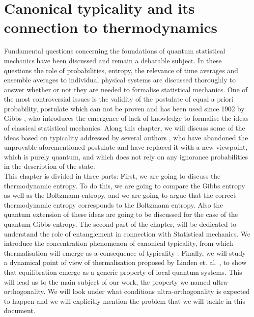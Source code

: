\chapter{Canonical typicality and its connection to thermodynamics}
Fundamental questions concerning the foundations of quantum statistical mechanics have been discussed and remain a debatable subject\cite{singh_foundations_2013}. In these questions the role of probabilities, entropy, the relevance of time averages and ensemble averages to individual physical systems are discussed thoroughly \cite{gemmer_quantum_2004} to answer whether or not they are needed to formalise statistical mechanics. One of the most controversial issues is the validity of the postulate of equal a priori probability, postulate which can not be proven\cite{singh_foundations_2013} and has been used since 1902 by Gibbs \cite{gibbs_elementary_1902}, who introduces the emergence of lack of knowledge to formalise the ideas of classical statistical mechanics. Along this chapter, we will discuss some of the ideas based on typicality addressed by several authors \cite{gemmer_quantum_2004, goldstein_canonical_2006, popescu_entanglement_2006}, who have abandoned the unprovable aforementioned postulate and have replaced it with a new viewpoint, which is purely quantum, and which does not rely on any ignorance probabilities in the description of the state.\\
\indent This chapter is divided in three parts: First, we are going to discuss the thermodynamic entropy. To do this, we are going to compare the Gibbs entropy as well as the Boltzmann entropy, and we are going to argue that the correct thermodynamic entropy corresponds to the Boltzmann entropy. Also the quantum extension of these ideas are going to be discussed for the case of the quantum Gibbs entropy. The second part of the chapter, will be dedicated to understand the role of entanglement in connection with Statistical mechanics. We introduce the concentration phenomenon of canonical typicality, from which thermalisation will emerge as a consequence of typicality \cite{popescu_entanglement_2006, popescu_foundations_2005}. Finally, we will study a dynamical point of view of thermalisation proposed by Linden et. al. \cite{linden_quantum_2009}, to show that equilibration emerge as a generic property of local quantum systems. This will lead us to the main subject of our work, the property we named ultra-orthogonality. We will look under what conditions ultra-orthogonality is expected to happen and we will explicitly mention the problem that we will tackle in this document.


